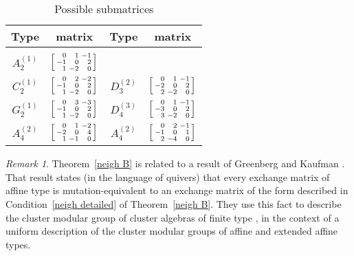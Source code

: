 \documentclass{amsart}
\theoremstyle{definition}
\theoremstyle{remark}
\newtheorem{remark}[proposition]{Remark}
\numberwithin{equation}{section}
\newcommand{\0}{{\mathbf{0}}}
\begin{document}
	\begin{table}
	\caption{Possible submatrices}
	\label{submat tab}	
	\begin{tabular}{|cc|cc|}
	Type & matrix & Type & matrix \\
	\hline & & & \\[-1ex]
	$A_{2}^{(1)}$ & $\begin{bsmallmatrix*}[r]
	0 & 1 & -1 \\
	-1 & 0 & 2 \\
	1 & -2 & 0
	\end{bsmallmatrix*}$ & & \\[4ex]
	$C_{2}^{(1)}$ & $\begin{bsmallmatrix*}[r]
	0 & 2 & -2 \\
	-1 & 0 & 2 \\
	1 & -2 & 0
	\end{bsmallmatrix*}$ &
	$D_{3}^{(2)}$ & $\begin{bsmallmatrix*}[r]
	0 & 1 & -1 \\
	-2 & 0 & 2 \\
	2 & -2 & 0
	\end{bsmallmatrix*}$ \\[4ex]
	$G_2^{(1)}$ & $\begin{bsmallmatrix*}[r]
	0 & 3 & -3 \\
	-1 & 0 & 2 \\
	1 & -2 & 0
	\end{bsmallmatrix*}$ &
	$D_4^{(3)}$ & $\begin{bsmallmatrix*}[r]
	0 & 1 & -1 \\
	-3 & 0 & 2 \\
	3 & -2 & 0
	\end{bsmallmatrix*}$ \\[4ex]
	$A_{4}^{(2)}$ & $\begin{bsmallmatrix*}[r]
	0 & 1 & -2 \\
	-2 & 0 & 4 \\
	1 & -1 & 0
	\end{bsmallmatrix*}$ &
	$A_{4}^{(2)}$ & $\begin{bsmallmatrix*}[r]
	0 & 2 & -1 \\
	-1 & 0 & 1 \\
	2 & -4 & 0
	\end{bsmallmatrix*}$ 
	\end{tabular}
	\end{table}

\begin{remark}\label{GreenbergKaufman remark}
Theorem~\ref{neigh B} is related to a result of Greenberg and Kaufman \cite[Theorem~5.1]{GreenbergKaufman}.
That result states (in the language of quivers) that every exchange matrix of affine type is mutation-equivalent to an exchange matrix of the form described in Condition~\ref{neigh detailed} of Theorem~\ref{neigh B}.
They use this fact to describe the cluster modular group of cluster algebras of finite type \cite[Theorem~5.2]{GreenbergKaufman}, in the context of a uniform description of the cluster modular groups of affine and extended affine types.
\end{remark}
\end{document}
